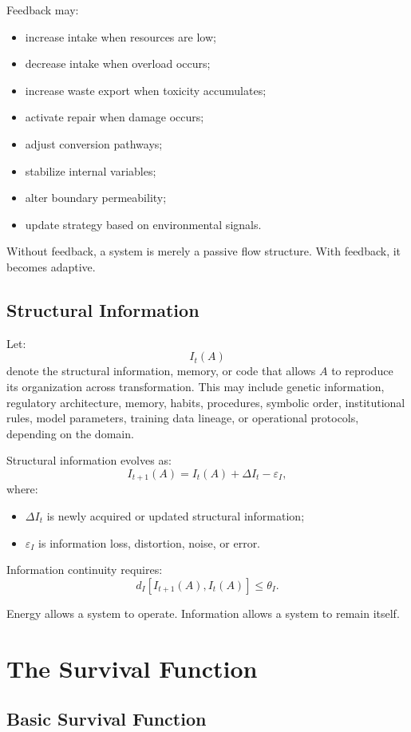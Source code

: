 \documentclass[11pt,a4paper]{article}
\begin{document}
Feedback may:
\begin{itemize}[leftmargin=2em]
\item increase intake when resources are low;
\item decrease intake when overload occurs;
\item increase waste export when toxicity accumulates;
\item activate repair when damage occurs;
\item adjust conversion pathways;
\item stabilize internal variables;
\item alter boundary permeability;
\item update strategy based on environmental signals.
\end{itemize}

Without feedback, a system is merely a passive flow structure. With feedback, it becomes adaptive.

\subsection{Structural Information}

Let:
\[
I_t(A)
\]
denote the structural information, memory, or code that allows $A$ to reproduce its organization across transformation. This may include genetic information, regulatory architecture, memory, habits, procedures, symbolic order, institutional rules, model parameters, training data lineage, or operational protocols, depending on the domain.

Structural information evolves as:
\[
I_{t+1}(A)=I_t(A)+\Delta I_t-\varepsilon_I,
\]
where:
\begin{itemize}[leftmargin=2em]
\item $\Delta I_t$ is newly acquired or updated structural information;
\item $\varepsilon_I$ is information loss, distortion, noise, or error.
\end{itemize}

Information continuity requires:
\[
d_I[I_{t+1}(A),I_t(A)]\leq\theta_I.
\]

Energy allows a system to operate. Information allows a system to remain itself.

\section{The Survival Function}

\subsection{Basic Survival Function}
\end{document}
